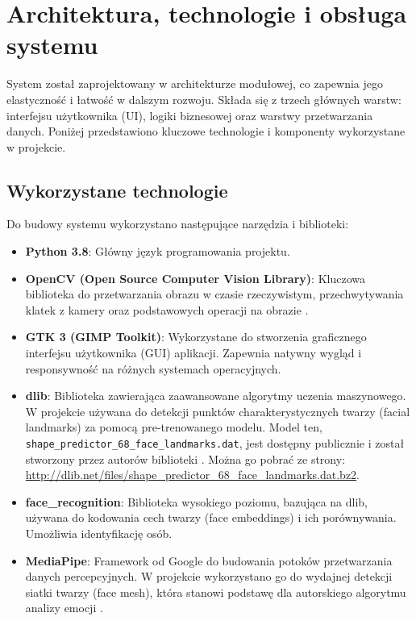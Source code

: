 \chapter{Architektura, technologie i obsługa systemu}
\label{chap:architektura}

System został zaprojektowany w architekturze modułowej, co zapewnia jego elastyczność i łatwość w dalszym rozwoju. Składa się z trzech głównych warstw: interfejsu użytkownika (UI), logiki biznesowej oraz warstwy przetwarzania danych. Poniżej przedstawiono kluczowe technologie i komponenty wykorzystane w projekcie.

\section{Wykorzystane technologie}
Do budowy systemu wykorzystano następujące narzędzia i biblioteki:
\begin{itemize}
    \item \textbf{Python 3.8}: Główny język programowania projektu.
    \item \textbf{OpenCV (Open Source Computer Vision Library)}: Kluczowa biblioteka do przetwarzania obrazu w czasie rzeczywistym, przechwytywania klatek z kamery oraz podstawowych operacji na obrazie \cite{opencv_library}.
    \item \textbf{GTK 3 (GIMP Toolkit)}: Wykorzystane do stworzenia graficznego interfejsu użytkownika (GUI) aplikacji. Zapewnia natywny wygląd i responsywność na różnych systemach operacyjnych.
    \item \textbf{dlib}: Biblioteka zawierająca zaawansowane algorytmy uczenia maszynowego. W projekcie używana do detekcji punktów charakterystycznych twarzy (facial landmarks) za pomocą pre-trenowanego modelu. Model ten, \texttt{shape\_predictor\_68\_face\_landmarks.dat}, jest dostępny publicznie i został stworzony przez autorów biblioteki \cite{dlib_library}. Można go pobrać ze strony: \url{http://dlib.net/files/shape_predictor_68_face_landmarks.dat.bz2}.
    \item \textbf{face\_recognition}: Biblioteka wysokiego poziomu, bazująca na dlib, używana do kodowania cech twarzy (face embeddings) i ich porównywania. Umożliwia identyfikację osób.
    \item \textbf{MediaPipe}: Framework od Google do budowania potoków przetwarzania danych percepcyjnych. W projekcie wykorzystano go do wydajnej detekcji siatki twarzy (face mesh), która stanowi podstawę dla autorskiego algorytmu analizy emocji \cite{mediapipe}.
\end{itemize}

